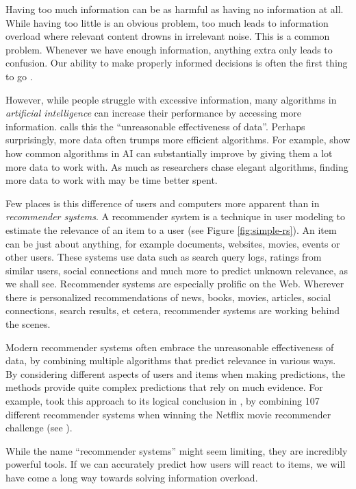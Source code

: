 \label{chap:intro}

Having too much information can be as harmful as having no information at all.
While having too little is an obvious problem,
too much leads to information overload where relevant content drowns in irrelevant noise.
This is a common problem. Whenever we have enough information,
anything extra only leads to confusion.
Our ability to make properly informed decisions is often the first thing to go
\cite[p.1]{Davenport2001}.

However, while people struggle with excessive information,
many algorithms in \emph{artificial intelligence}  
can increase their performance by accessing more information.
\citet{Halevy2009} calls this the ``unreasonable effectiveness of data''.
Perhaps surprisingly, more data often trumps more efficient algorithms.
For example, \citet[p.3]{Banko2001} show how common algorithms in AI 
can substantially improve by giving them a lot more data to work with.
As much as researchers chase elegant algorithms, finding more data to work with may be time better spent.

Few places is this difference of users and computers more apparent than in \emph{recommender systems}.
A recommender system is a technique in user modeling to estimate the relevance of an item to a user
(see Figure \ref{fig:simple-rs}).
An item can be just about anything, for example documents, websites, movies, events or other users.
These systems use data such as search query logs, 
ratings from similar users, social connections and much more
to predict unknown relevance, as we shall see.
Recommender systems are especially prolific on the Web. 
Wherever there is personalized recommendations of news, books, movies,
articles, social connections, search results, et cetera, recommender systems are working behind the scenes.

Modern recommender systems often embrace the 
unreasonable effectiveness of data,
by combining multiple algorithms that predict relevance in various ways.
By considering different aspects of users and items when making predictions,
the methods provide quite complex predictions that rely on much evidence.
For example, \citeauthor{Bell2007} took this approach to its logical conclusion in \citet[p.1]{Bell2007}, by 
combining 107 different recommender systems when winning the 
Netflix movie recommender challenge
(see \citet{Linden2009}).

While the name ``recommender systems'' might seem limiting, they are incredibly powerful tools.
If we can accurately predict how users will react to items,
we will have come a long way towards solving information overload.

